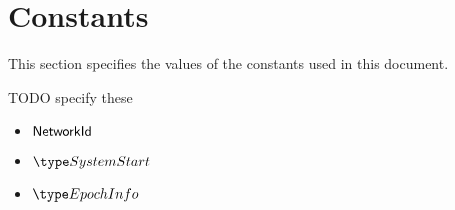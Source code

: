\section{Constants}

This section specifies the values of the constants used in this document.

\begin{note}
  TODO specify these
\end{note}

\begin{itemize}
  \item $\mathsf{NetworkId}$

  \item $\SystemStart$

  \item $\EpochInfo$

\end{itemize}
